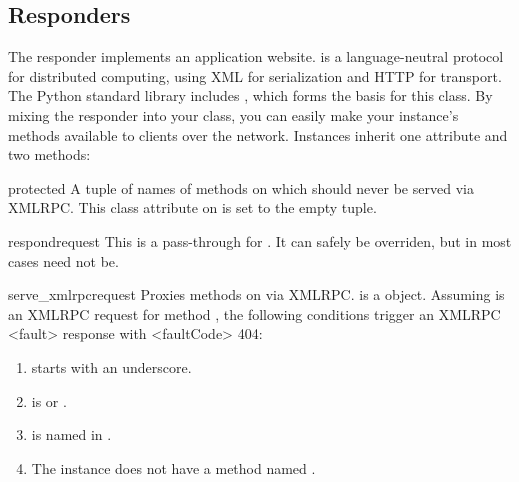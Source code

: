\subsection{ Responders \label{xmlrpc}}

The  responder implements an application website.
 is a language-neutral protocol for
distributed computing, using XML for serialization and HTTP for transport. The
Python standard library includes , which forms the
basis for this class. By mixing the  responder into your class,
you can easily make your instance's methods available to clients over the
network. Instances inherit one attribute and two methods:

\begin{memberdesc}[tuple]{protected} A tuple of names of methods on 
which should never be served via XMLRPC. This class attribute on 
is set to the empty tuple.\end{memberdesc}

\begin{methoddesc}{respond}{request}
This is a pass-through for . It can safely be overriden, but
in most cases need not be.
\end{methoddesc}

\begin{methoddesc}{serve_xmlrpc}{request}
Proxies methods on  via XMLRPC.  is a 
object. Assuming  is an XMLRPC request for method , the
following conditions trigger an XMLRPC <fault> response with <faultCode> 404:

\begin{enumerate}

\item {} starts with an underscore.

\item {} is  or .

\item {} is named in .

\item The instance does not have a method named .

\end{enumerate}
\end{methoddesc}


